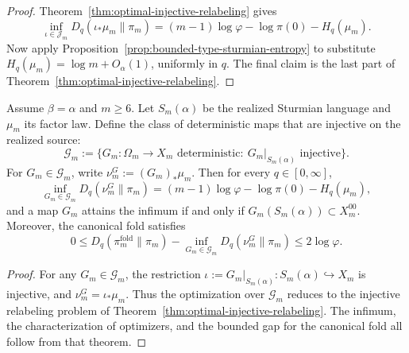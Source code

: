 \begin{proof}
Theorem~\ref{thm:optimal-injective-relabeling} gives
\[
\inf_{\iota\in\mathcal J_m}D_q(\iota_*\mu_m\|\pi_m)
=
(m-1)\log\varphi-\log\pi(0)-H_q(\mu_m).
\]
Now apply Proposition~\ref{prop:bounded-type-sturmian-entropy} to substitute
\(H_q(\mu_m)=\log m+O_\alpha(1)\), uniformly in \(q\). The final claim is the
last part of Theorem~\ref{thm:optimal-injective-relabeling}.
\end{proof}

\begin{theorem}
\label{thm:lossless-coarse-graining-envelope}
Assume \(\beta=\alpha\) and \(m\ge 6\). Let \(S_m(\alpha)\) be the realized
Sturmian language and \(\mu_m\) its factor law. Define the class of
deterministic maps that are injective on the realized source:
\[
\mathcal G_m
:=
\{G_m:\Omega_m\to X_m \text{ deterministic}:\
G_m|_{S_m(\alpha)}\text{ injective}\}.
\]
For \(G_m\in\mathcal G_m\), write
\(\nu_m^G:=(G_m)_*\mu_m\). Then for every \(q\in[0,\infty]\),
\[
\inf_{G_m\in\mathcal G_m}D_q(\nu_m^G\|\pi_m)
=
(m-1)\log\varphi-\log\pi(0)-H_q(\mu_m),
\]
and a map \(G_m\) attains the infimum if and only if
\(G_m(S_m(\alpha))\subset X_m^{00}\). Moreover, the canonical fold satisfies
\[
0\le D_q(\pi_m^{\mathrm{fold}}\|\pi_m)
-\inf_{G_m\in\mathcal G_m}D_q(\nu_m^G\|\pi_m)
\le 2\log\varphi.
\]
\end{theorem}

\begin{proof}
For any \(G_m\in\mathcal G_m\), the restriction
\(\iota:=G_m|_{S_m(\alpha)}:S_m(\alpha)\hookrightarrow X_m\) is injective, and
\(\nu_m^G=\iota_*\mu_m\). Thus the optimization over \(\mathcal G_m\) reduces
to the injective relabeling problem of
Theorem~\ref{thm:optimal-injective-relabeling}. The infimum, the
characterization of optimizers, and the bounded gap for the canonical fold all
follow from that theorem.
\end{proof}
